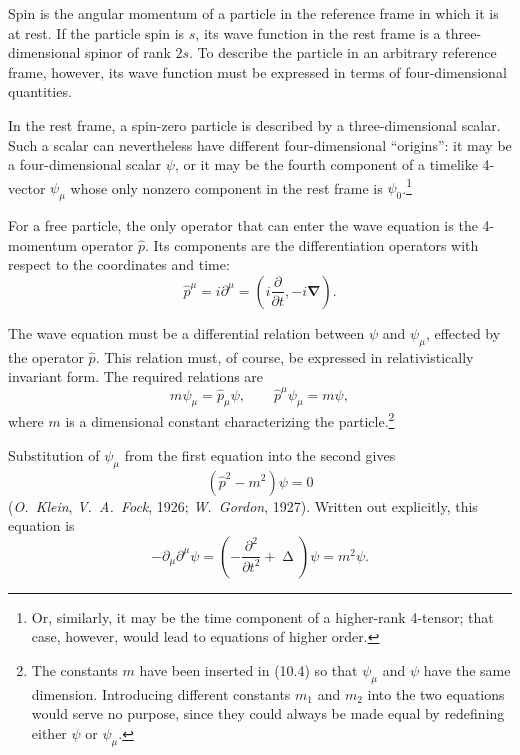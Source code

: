 Spin is the angular momentum of a particle in the reference frame in which it is at rest. If the particle spin is $s$, its wave function in the rest frame is a three-dimensional spinor of rank $2s$. To describe the particle in an arbitrary reference frame, however, its wave function must be expressed in terms of four-dimensional quantities.

In the rest frame, a spin-zero particle is described by a three-dimensional scalar. Such a scalar can nevertheless have different four-dimensional ``origins'': it may be a four-dimensional scalar $\psi$, or it may be the fourth component of a timelike 4-vector $\psi_\mu$ whose only nonzero component in the rest frame is $\psi_0$.\footnote{Or, similarly, it may be the time component of a higher-rank 4-tensor; that case, however, would lead to equations of higher order.}

For a free particle, the only operator that can enter the wave equation is the 4-momentum operator $\widehat p$. Its components are the differentiation operators with respect to the coordinates and time:
\begin{equation}
\widehat p^\mu=i\partial^\mu
=\left(i\frac{\partial}{\partial t},-i\boldsymbol{\nabla}\right).
\tag{10.3}
\end{equation}

The wave equation must be a differential relation between $\psi$ and $\psi_\mu$, effected by the operator $\widehat p$. This relation must, of course, be expressed in relativistically invariant form. The required relations are
\begin{equation}
m\psi_\mu=\widehat p_\mu\psi,
\qquad
\widehat p^\mu\psi_\mu=m\psi,
\tag{10.4}
\end{equation}
where $m$ is a dimensional constant characterizing the particle.\footnote{The constants $m$ have been inserted in (10.4) so that $\psi_\mu$ and $\psi$ have the same dimension. Introducing different constants $m_1$ and $m_2$ into the two equations would serve no purpose, since they could always be made equal by redefining either $\psi$ or $\psi_\mu$.}

Substitution of $\psi_\mu$ from the first equation into the second gives
\begin{equation}
(\widehat p^2-m^2)\psi=0
\tag{10.5}
\end{equation}
(\emph{O.~Klein}, \emph{V.~A.~Fock}, 1926; \emph{W.~Gordon}, 1927). Written out explicitly, this equation is
\begin{equation}
-\partial_\mu\partial^\mu\psi
=\left(-\frac{\partial^2}{\partial t^2}+\mathop{\Delta}\right)\psi
=m^2\psi.
\tag{10.6}
\end{equation}

